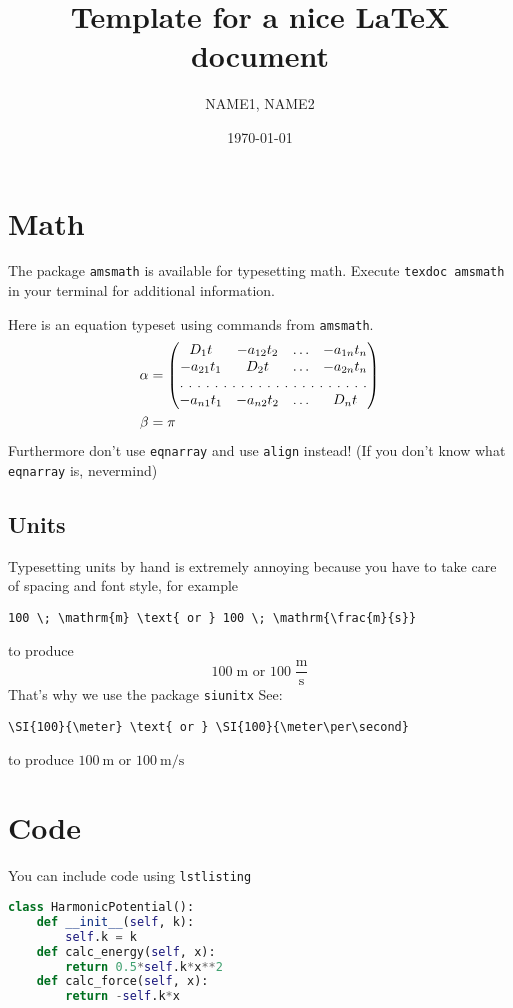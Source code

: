 \documentclass[a4paper,11pt,bibtotoc]{scrartcl}
\begin{document}
\titlehead{Simulation Methods in Physics I \hfill WS 2021/2022}
\title{Template for a nice \LaTeX{} document}
\author{NAME1, NAME2}
\date{\today}
\publishers{Institute for Computational Physics, University of
  Stuttgart}
\maketitle

\tableofcontents

\section{Math}

The package \verb|amsmath| is available for typesetting math. Execute \verb|texdoc amsmath| in your terminal for additional information.

Here is an equation typeset using commands from \verb|amsmath|.
%
\begin{align}
	\alpha &= 
	\begin{pmatrix}
		D_1t       & -a_{12}t_2 & \dots & -a_{1n}t_n \\
		-a_{21}t_1 & D_2t       & \dots & -a_{2n}t_n \\
		\hdotsfor[2]{4} \\
		-a_{n1}t_1 & -a_{n2}t_2 & \dots & D_nt
	\end{pmatrix} \\
	\beta &= \pi
\end{align}
%
Furthermore don't use \verb|eqnarray| and use \verb|align| instead! (If you don't know what \verb|eqnarray| is, nevermind)

\subsection{Units}

Typesetting units by hand is extremely annoying because you have to take care of spacing and font style, for example
%
\begin{verbatim}
100 \; \mathrm{m} \text{ or } 100 \; \mathrm{\frac{m}{s}}
\end{verbatim}
%
to produce \[ 100 \; \mathrm{m} \text{ or } 100 \; \mathrm{\frac{m}{s}} \]
That's why we use the package \verb|siunitx| See:
%
\begin{verbatim}
\SI{100}{\meter} \text{ or } \SI{100}{\meter\per\second}
\end{verbatim}
%
to produce $\SI{100}{\meter} \text{ or } \SI{100}{\meter\per\second}$

\section{Code}
You can include code using \verb|lstlisting|

\begin{lstlisting}[language=Python]
class HarmonicPotential():
	def __init__(self, k):
		self.k = k
	def calc_energy(self, x):
		return 0.5*self.k*x**2
	def calc_force(self, x):
		return -self.k*x
		
\end{lstlisting}
\end{document}
